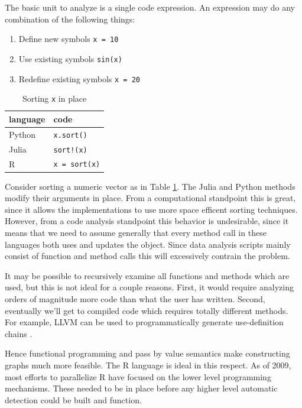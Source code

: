 \documentclass[12pt]{article}
\begin{document}
The basic unit to analyze is a single code expression.
An expression may do any combination of the following things:
\begin{enumerate}
    \item Define new symbols \texttt{x = 10}
    \item Use existing symbols \texttt{sin(x)}
    \item Redefine existing symbols \texttt{x = 20}
\end{enumerate}

\begin{table}[]
\centering
    \caption{Sorting \texttt{x} in place}
\label{tab-sort}
\begin{tabular}{ll}
    \textbf{language} & \textbf{code}        \\
\hline
    Python   & \texttt{x.sort()}    \\
    Julia    & \texttt{sort!(x)}    \\
    R        & \texttt{x = sort(x)}
\end{tabular}
\end{table}

Consider sorting a numeric vector as in Table \ref{tab-sort}.
The Julia and Python methods modify their arguments in place.  From a
computational standpoint this is great, since it allows the implementations
to use more space efficent sorting techniques. However, from a code
analysis standpoint this behavior is undesirable, since it means that we
need to assume generally that every method call in these languages both
uses and updates the object. Since data analysis scripts mainly consist of
function and method calls this will excessively contrain the problem.

It may be possible to recursively examine all functions and methods which
are used, but this is not ideal for a couple reasons. First, it would
require analyzing orders of magnitude more code than what the user has
written. Second, eventually we'll get to compiled code which requires
totally different methods. For example, LLVM can be used to
programmatically generate use-definition chains \cite{llvm}.

Hence functional programming and pass by value semantics make constructing
graphs much more feasible. The R language is ideal in this respect.
As of 2009, most efforts to parallelize R have focused on the lower level
programming mechanisms. These needed to be in place before any higher level
automatic detection could be built and function.
\cite{schmidberger2009state} 
\end{document}
